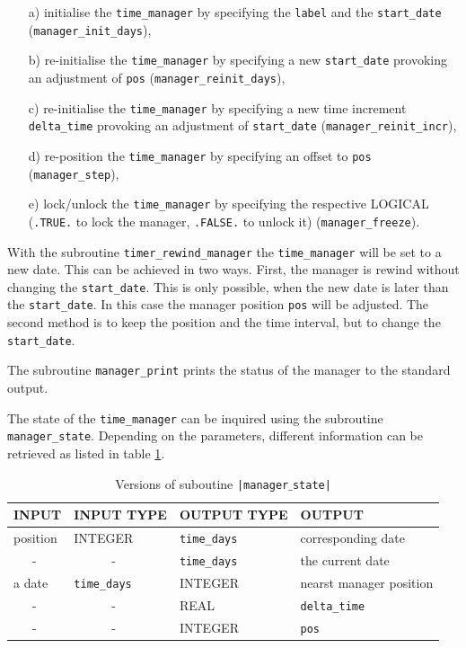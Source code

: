 \documentclass[twoside]{article}
\begin{document}
\begin{itemize}
\item[a)] initialise the \verb|time_manager| by specifying the \verb|label|
          and the \verb|start_date| (\verb|manager_init_days|),
\item[b)] re-initialise the \verb|time_manager| by specifying a new
          \verb|start_date| provoking an adjustment of \verb|pos| 
          (\verb|manager_reinit_days|),
\item[c)] re-initialise the \verb|time_manager| by specifying a new time
          increment \verb|delta_time| provoking an adjustment of
          \verb|start_date| (\verb|manager_reinit_incr|),
\item[d)] re-position the \verb|time_manager| by specifying an offset to
          \verb|pos| (\verb|manager_step|),
\item[e)] lock/unlock the \verb|time_manager| by specifying the respective
          {\footnotesize LOGICAL} (\verb|.TRUE.| to lock the manager, \verb|.FALSE.| to unlock
          it) (\verb|manager_freeze|).
\end{itemize}
%
With the subroutine \verb|timer_rewind_manager| the \verb|time_manager| will be 
set to a new date. This can be achieved in two ways. 
%
First, the manager is rewind without changing the \verb|start_date|. This is
only possible, when the new date is later than the \verb|start_date|. In this
case the manager position \verb|pos| will be adjusted. 
%
The second method is to keep the position and the time interval, but to
change the \verb|start_date|.

The subroutine \verb|manager_print| prints the status of the manager to the
standard output.

The state of the \verb|time_manager| can be inquired using the subroutine 
\verb|manager_state|. 
Depending on the parameters, different information can be retrieved as 
listed in table \ref{tab:manager_state}.
%
\begin{table}
\centering
\caption{Versions of suboutine {\tt|manager$\_$state|} \label{tab:manager_state}}
\begin{tabular}{llll}
INPUT & INPUT TYPE & OUTPUT TYPE & OUTPUT \\ \hline
position & {\footnotesize INTEGER}  & \verb|time_days| & corresponding date      \\
~~~-~~~  & ~~~~~~-         & \verb|time_days| & the current date    \\
a date   & \verb|time_days|& {\footnotesize INTEGER}   & nearst manager position \\
~~~-     & ~~~~~~-         & {\footnotesize REAL}      & \verb|delta_time|\\
~~~-     & ~~~~~~-         & {\footnotesize INTEGER}   & \verb|pos|\\
\end{tabular}
\end{table}
%
\end{document}
